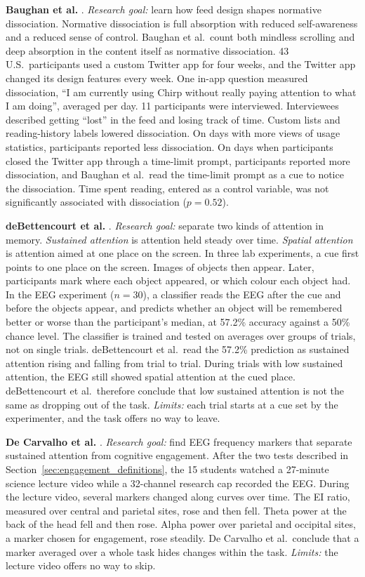 \documentclass[12pt,a4paper]{report}
\begin{document}
\textbf{Baughan et al.} \cite{baughan_i_2022}. \emph{Research goal:} learn how feed design shapes normative dissociation. Normative dissociation is full absorption with reduced self-awareness and a reduced sense of control. Baughan et al.\ count both mindless scrolling and deep absorption in the content itself as normative dissociation. 43 U.S.\ participants used a custom Twitter app for four weeks, and the Twitter app changed its design features every week. One in-app question measured dissociation, ``I am currently using Chirp without really paying attention to what I am doing'', averaged per day. 11 participants were interviewed. Interviewees described getting ``lost'' in the feed and losing track of time. Custom lists and reading-history labels lowered dissociation. On days with more views of usage statistics, participants reported less dissociation. On days when participants closed the Twitter app through a time-limit prompt, participants reported more dissociation, and Baughan et al.\ read the time-limit prompt as a cue to notice the dissociation. Time spent reading, entered as a control variable, was not significantly associated with dissociation ($p=0.52$).

\textbf{deBettencourt et al.} \cite{debettencourt_sustained_2021}. \emph{Research goal:} separate two kinds of attention in memory. \emph{Sustained attention} is attention held steady over time. \emph{Spatial attention} is attention aimed at one place on the screen. In three lab experiments, a cue first points to one place on the screen. Images of objects then appear. Later, participants mark where each object appeared, or which colour each object had. In the EEG experiment ($n=30$), a classifier reads the EEG after the cue and before the objects appear, and predicts whether an object will be remembered better or worse than the participant's median, at 57.2\% accuracy against a 50\% chance level. The classifier is trained and tested on averages over groups of trials, not on single trials. deBettencourt et al.\ read the 57.2\% prediction as sustained attention rising and falling from trial to trial. During trials with low sustained attention, the EEG still showed spatial attention at the cued place. deBettencourt et al.\ therefore conclude that low sustained attention is not the same as dropping out of the task. \emph{Limits:} each trial starts at a cue set by the experimenter, and the task offers no way to leave.

\textbf{De Carvalho et al.} \cite{de_carvalho_selection_2026}. \emph{Research goal:} find EEG frequency markers that separate sustained attention from cognitive engagement. After the two tests described in Section~\ref{sec:engagement_definitions}, the 15 students watched a 27-minute science lecture video while a 32-channel research cap recorded the EEG. During the lecture video, several markers changed along curves over time. The EI ratio, measured over central and parietal sites, rose and then fell. Theta power at the back of the head fell and then rose. Alpha power over parietal and occipital sites, a marker chosen for engagement, rose steadily. De Carvalho et al.\ conclude that a marker averaged over a whole task hides changes within the task. \emph{Limits:} the lecture video offers no way to skip.
\end{document}
